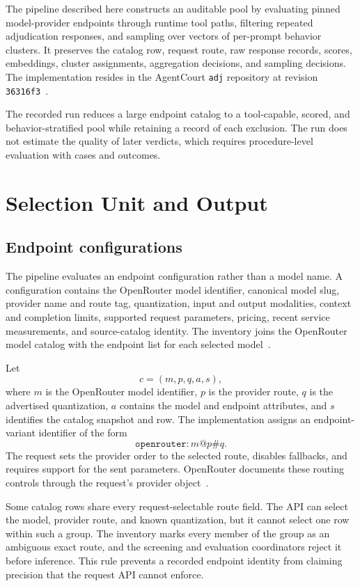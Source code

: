 \documentclass[11pt]{article}
\newcommand{\code}[1]{\texttt{#1}}
\begin{document}
The pipeline described here constructs an auditable pool by evaluating pinned model-provider endpoints through runtime tool paths, filtering repeated adjudication responses, and sampling over vectors of per-prompt behavior clusters.  It preserves the catalog row, request route, raw response records, scores, embeddings, cluster assignments, aggregation decisions, and sampling decisions.  The implementation resides in the AgentCourt \code{adj} repository at revision \code{36316f3}~\cite{adjrepo}.

The recorded run reduces a large endpoint catalog to a tool-capable, scored, and behavior-stratified pool while retaining a record of each exclusion.  The run does not estimate the quality of later verdicts, which requires procedure-level evaluation with cases and outcomes.

\section{Selection Unit and Output}

\subsection{Endpoint configurations}

The pipeline evaluates an endpoint configuration rather than a model name.  A configuration contains the OpenRouter model identifier, canonical model slug, provider name and route tag, quantization, input and output modalities, context and completion limits, supported request parameters, pricing, recent service measurements, and source-catalog identity.  The inventory joins the OpenRouter model catalog with the endpoint list for each selected model~\cite{openrouter-models,openrouter-endpoints}.

Let
\[
  c=(m,p,q,a,s),
\]
where $m$ is the OpenRouter model identifier, $p$ is the provider route, $q$ is the advertised quantization, $a$ contains the model and endpoint attributes, and $s$ identifies the catalog snapshot and row.  The implementation assigns an endpoint-variant identifier of the form
\[
  \code{openrouter:}\,m\code{@}p\code{\#}q.
\]
The request sets the provider order to the selected route, disables fallbacks, and requires support for the sent parameters.  OpenRouter documents these routing controls through the request's provider object~\cite{openrouter-routing}.

Some catalog rows share every request-selectable route field.  The API can select the model, provider route, and known quantization, but it cannot select one row within such a group.  The inventory marks every member of the group as an ambiguous exact route, and the screening and evaluation coordinators reject it before inference.  This rule prevents a recorded endpoint identity from claiming precision that the request API cannot enforce.
\end{document}
